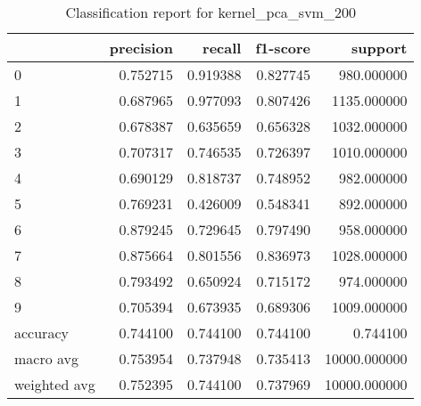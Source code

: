 \begin{table}[htb!]
\centering
\caption{Classification report for kernel_pca_svm_200}
\label{tab:classification-report-kernel_pca_svm_200}
\begin{tabular}{lrrrr}
\toprule
 & precision & recall & f1-score & support \\
\midrule
0 & 0.752715 & 0.919388 & 0.827745 & 980.000000 \\
1 & 0.687965 & 0.977093 & 0.807426 & 1135.000000 \\
2 & 0.678387 & 0.635659 & 0.656328 & 1032.000000 \\
3 & 0.707317 & 0.746535 & 0.726397 & 1010.000000 \\
4 & 0.690129 & 0.818737 & 0.748952 & 982.000000 \\
5 & 0.769231 & 0.426009 & 0.548341 & 892.000000 \\
6 & 0.879245 & 0.729645 & 0.797490 & 958.000000 \\
7 & 0.875664 & 0.801556 & 0.836973 & 1028.000000 \\
8 & 0.793492 & 0.650924 & 0.715172 & 974.000000 \\
9 & 0.705394 & 0.673935 & 0.689306 & 1009.000000 \\
accuracy & 0.744100 & 0.744100 & 0.744100 & 0.744100 \\
macro avg & 0.753954 & 0.737948 & 0.735413 & 10000.000000 \\
weighted avg & 0.752395 & 0.744100 & 0.737969 & 10000.000000 \\
\bottomrule
\end{tabular}
\end{table}
